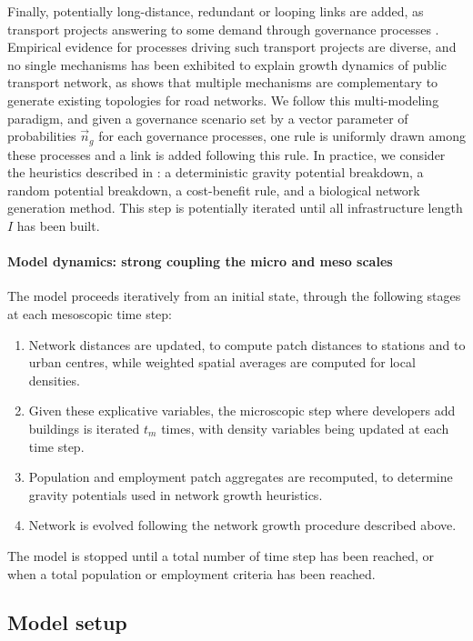 \documentclass[letterpaper]{article}
\begin{document}
Finally, potentially long-distance, redundant or looping links are added, as transport projects answering to some demand through governance processes \citep{le2015modeling}. Empirical evidence for processes driving such transport projects are diverse, and no single mechanisms has been exhibited to explain growth dynamics of public transport network, as \cite{raimbault2018multi} shows that multiple mechanisms are complementary to generate existing topologies for road networks. We follow this multi-modeling paradigm, and given a governance scenario set by a vector parameter of probabilities $\vec{n}_g$ for each governance processes, one rule is uniformly drawn among these processes and a link is added following this rule. In practice, we consider the heuristics described in \cite{raimbault2018multi}: a deterministic gravity potential breakdown, a random potential breakdown, a cost-benefit rule, and a biological network generation method. This step is potentially iterated until all infrastructure length $I$ has been built.


\paragraph{Model dynamics: strong coupling the micro and meso scales}

The model proceeds iteratively from an initial state, through the following stages at each mesoscopic time step:
\begin{enumerate}
	\item Network distances are updated, to compute patch distances to stations and to urban centres, while weighted spatial averages are computed for local densities.
	\item Given these explicative variables, the microscopic step where developers add buildings is iterated $t_m$ times, with density variables being updated at each time step.
	\item Population and employment patch aggregates are recomputed, to determine gravity potentials used in network growth heuristics.
	\item Network is evolved following the network growth procedure described above.
\end{enumerate}

The model is stopped until a total number of time step has been reached, or when a total population or employment criteria has been reached.



\subsection{Model setup}
\end{document}
